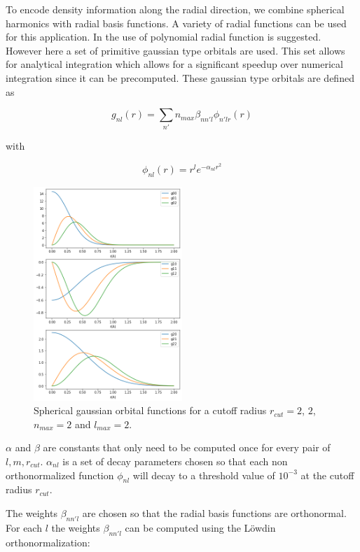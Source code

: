 To encode density information along the radial direction, we combine spherical harmonics with radial basis functions.
A variety of radial functions can be used for this application.
In \cite{KUHL1982236} the use of polynomial radial function is suggested.
However here a set of primitive gaussian type orbitals are used.
This set allows for analytical integration which allows for a significant speedup over numerical integration since it can be precomputed.  
These gaussian type orbitals are defined as

$$g_{nl}(r) = \sum_{n'}{n_{max}} \beta_{nn'l} \phi_{n'lr}(r) $$

with 

$$\phi_{nl}(r) = r^l e^{-\alpha_{nl}r^2} $$ %


\begin{figure} [h]
  \centering
  \includegraphics[width=0.5\textwidth]{figures/snap/gaus_orb.png} %
  \caption{Spherical gaussian orbital functions for a cutoff radius $r_{cut}=2$, $2$, $n_{max}=2$ and $l_{max}=2$. }
  \label{fig:gaussians}
\end{figure}

$\alpha$ and $\beta$ are constants that only need to be computed once for every pair of $l,m, r_{cut}$.
$\alpha_{nl}$ is a set of decay parameters chosen so that each non orthonormalized function $\phi_{nl}$ 
will decay to a threshold value of $10^{-3}$ at the cutoff radius $r_{cut}$.

The weights $\beta_{nn'l}$ are chosen so that the radial basis functions are orthonormal.
For each $l$ the weights $\beta_{nn'l}$ can be computed using the Löwdin orthonormalization:

